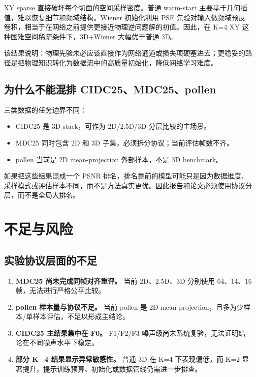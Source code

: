 \documentclass[UTF8, scheme=plain, 11pt, a4paper]{ctexart}
\begin{document}
XY sparse 直接破坏每个切面的空间采样密度。普通 warm-start 主要基于几何插值，难以恢复细节和频域结构。Wiener 初始化利用 PSF 先验对输入做频域预反卷积，相当于在网络之前提供更接近物理逆问题解的初值。因此，在 K=4 XY 这种困难空间稀疏条件下，3D+Wiener 大幅优于普通 3D。

该结果说明：物理先验未必应该直接作为网络通道或损失项硬塞进去；更稳妥的路径是把物理知识转化为数据流中的高质量初始化，降低网络学习难度。

\subsection{为什么不能混排 CIDC25、MDC25、pollen}

三类数据的任务边界不同：

\begin{itemize}[leftmargin=*]
  \item CIDC25 是 3D stack，可作为 2D/2.5D/3D 分层比较的主场景。
  \item MDC25 同时包含 2D 和 3D 子集，必须拆分协议；当前评估帧数不齐。
  \item pollen 当前是 2D mean-projection 外部样本，不是 3D benchmark。
\end{itemize}

如果把这些结果混成一个 PSNR 排名，排名靠前的模型可能只是因为数据维度、采样模式或评估样本不同，而不是方法真实更优。因此报告和论文必须使用协议分层，而不是全局大排名。

\section{不足与风险}

\subsection{实验协议层面的不足}

\begin{enumerate}[leftmargin=*]
  \item \textbf{MDC25 尚未完成同帧对齐重评。} 当前 2D、2.5D、3D 分别使用 64、14、16 帧，无法进行严格公平比较。
  \item \textbf{pollen 样本量与协议不足。} 当前 pollen 是 2D mean projection，且多为少样本/单样本评估，不足以形成主结论。
  \item \textbf{CIDC25 主结果集中在 F0。} F1/F2/F3 噪声级尚未系统复验，无法证明结论在不同噪声水平下稳定。
  \item \textbf{部分 K=4 结果显示异常敏感性。} 普通 3D 在 K=4 下表现偏低，而 K=2 显著提升，提示训练预算、初始化或数据管线仍需进一步排查。
\end{enumerate}
\end{document}
